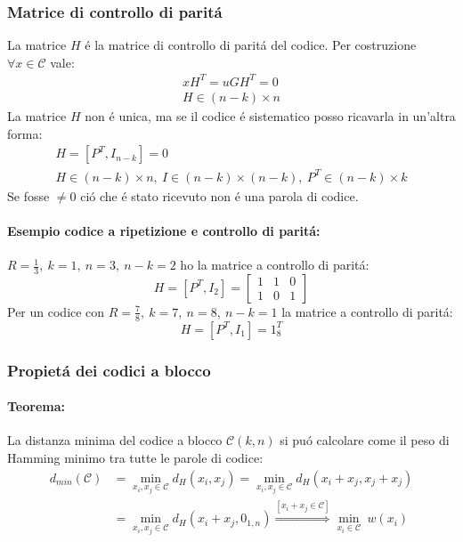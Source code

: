         \subsubsection{Matrice di controllo di paritá}\label{Matrice di controllo di parita}
            La matrice $H$ é la matrice di controllo di paritá del codice. Per costruzione $\forall x \in \mathcal{C}$ vale:
            \begin{gather}
                    xH^T = uGH^T = 0 \nonumber \\
                    H\in (n-k) \times n\nonumber 
            \end{gather}
            La matrice $H$ non é unica, ma se il codice é sistematico posso ricavarla in un'altra forma:
            \begin{gather}
                H = [P^T,I_{n-k}] = 0 \nonumber \\
                H\in (n-k) \times n,\ I\in (n-k)\times (n-k),\ P^T\in (n-k) \times k \nonumber
            \end{gather}
            Se fosse $\neq 0$ ció che é stato ricevuto non é una parola di codice.
            
            \paragraph{Esempio codice a ripetizione e controllo di paritá:}
                $R = \frac{1}{3},\ k=1,\ n=3,\ n-k=2$ ho la matrice a controllo di paritá:
                \[
                    H= [P^T,I_2] =
                        \begin{bmatrix}
                        1 & 1 & 0\\
                        1 & 0 & 1
                        \end{bmatrix}  
                \]  
                Per un codice con $R = \frac{7}{8},\ k=7,\ n=8,\ n-k=1$ la matrice a controllo di paritá:
                \[
                    H= [P^T,I_1] = 1_8^T
                \]
        \subsubsection{Propietá dei codici a blocco}
            \paragraph{Teorema:} La distanza minima del codice a blocco $\mathcal{C}(k,n)$ si puó calcolare come il 
            peso di Hamming minimo tra tutte le parole di codice:
            \begin{align}
                d_{min}(\mathcal{C}) &= \underset{x_i,x_j\in\mathcal{C}}{\min} d_H(x_i,x_j) = \underset{x_i,x_j\in\mathcal{C}}{\min} d_H(x_i+x_j,x_j+x_j)\nonumber \\
                                     &= \underset{x_i,x_j\in\mathcal{C}}{\min} d_H(x_i+x_j,0_{1,n}) \overset{[x_i+x_j\in\mathcal{C}]}{\Rightarrow} \underset{x_i\in\mathcal{C}}{\min}\ w(x_i)\nonumber
            \end{align}
